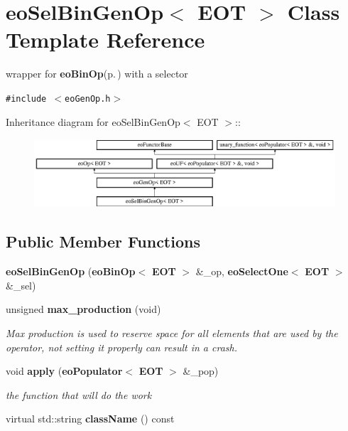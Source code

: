 \section{eo\-Sel\-Bin\-Gen\-Op$<$ EOT $>$ Class Template Reference}
\label{classeo_sel_bin_gen_op}
wrapper for {\bf eo\-Bin\-Op}{\rm (p.\,\pageref{classeo_bin_op})} with a selector  


{\tt \#include $<$eo\-Gen\-Op.h$>$}

Inheritance diagram for eo\-Sel\-Bin\-Gen\-Op$<$ EOT $>$::\begin{figure}[H]
\begin{center}
\leavevmode
\includegraphics[height=2.54835cm]{classeo_sel_bin_gen_op}
\end{center}
\end{figure}
\subsection*{Public Member Functions}
\begin{CompactItemize}
\item 
{\bf eo\-Sel\-Bin\-Gen\-Op} ({\bf eo\-Bin\-Op}$<$ {\bf EOT} $>$ \&\_\-op, {\bf eo\-Select\-One}$<$ {\bf EOT} $>$ \&\_\-sel)\label{classeo_sel_bin_gen_op_a0}

\item 
unsigned {\bf max\_\-production} (void)\label{classeo_sel_bin_gen_op_a1}

\begin{CompactList}\small\item\em Max production is used to reserve space for all elements that are used by the operator, not setting it properly can result in a crash. \item\end{CompactList}\item 
void {\bf apply} ({\bf eo\-Populator}$<$ {\bf EOT} $>$ \&\_\-pop)\label{classeo_sel_bin_gen_op_a2}

\begin{CompactList}\small\item\em the function that will do the work \item\end{CompactList}\item 
virtual std::string {\bf class\-Name} () const \label{classeo_sel_bin_gen_op_a3}

\end{CompactItemize}
